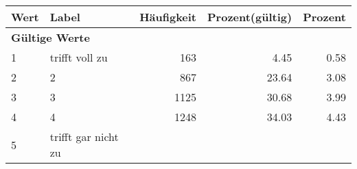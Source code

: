     \begin{longtable}{lXrrr}
     \toprule
     \textbf{Wert} & \textbf{Label} & \textbf{Häufigkeit} & \textbf{Prozent(gültig)} & \textbf{Prozent} \\
     \endhead
     \midrule
     \multicolumn{5}{l}{\textbf{Gültige Werte}}\\

     1 &
     \multicolumn{1}{X}{ trifft voll zu   } &


       \num{163} &
       \num[round-mode=places,round-precision=2]{4,45} &
         \num[round-mode=places,round-precision=2]{0,58} \\

     2 &
     \multicolumn{1}{X}{ 2   } &


       \num{867} &
       \num[round-mode=places,round-precision=2]{23,64} &
         \num[round-mode=places,round-precision=2]{3,08} \\

     3 &
     \multicolumn{1}{X}{ 3   } &


       \num{1125} &
       \num[round-mode=places,round-precision=2]{30,68} &
         \num[round-mode=places,round-precision=2]{3,99} \\

     4 &
     \multicolumn{1}{X}{ 4   } &


       \num{1248} &
       \num[round-mode=places,round-precision=2]{34,03} &
         \num[round-mode=places,round-precision=2]{4,43} \\

     5 &
     \multicolumn{1}{X}{ trifft gar nicht zu   } &



\end{longtable}
